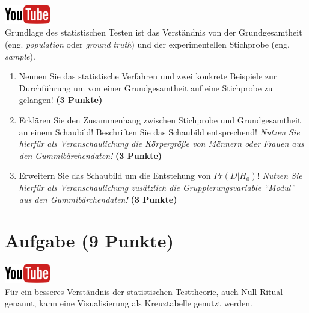 \documentclass[a4paper, 9pt]{scrartcl}\usepackage[]{graphicx}\usepackage[]{xcolor}
\begin{document}
\hfill\href{https://youtu.be/aHVYuFKTqZs}{\includegraphics[width =
  2cm]{img/youtube}}\\[1Ex]

Grundlage des statistischen Testen ist das Verst{\"a}ndnis von der
Grundgesamtheit (eng. \textit{population} oder \textit{ground truth}) und
der experimentellen Stichprobe (eng. \textit{sample}). 

\begin{enumerate}
\item Nennen Sie das statistische Verfahren und zwei konkrete Beispiele zur
  Durchf{\"u}hrung um von einer Grundgesamtheit auf eine Stichprobe zu
  gelangen! \textbf{(3 Punkte)}
\item Erkl{\"a}ren Sie den Zusammenhang zwischen Stichprobe und Grundgesamtheit
  an einem Schaubild! Beschriften Sie das Schaubild entsprechend!
  \textit{Nutzen Sie hierf{\"u}r als Veranschaulichung die K{\"o}rpergr{\"o}{\ss}e von
    M{\"a}nnern oder Frauen aus den Gummib{\"a}rchendaten!}  \textbf{(3 Punkte)}
\item Erweitern Sie das Schaubild um die Entstehung von $Pr(D|H_0)$!
  \textit{Nutzen Sie hierf{\"u}r als Veranschaulichung zus{\"a}tzlich die
    Gruppierungsvariable "`Modul"' aus den Gummib{\"a}rchendaten!}  \textbf{(3
    Punkte)}
\end{enumerate} 
\clearpage

\section{Aufgabe \hfill (9 Punkte)}

\hfill\href{https://youtu.be/Ric8ne39DtI}{\includegraphics[width =
  2cm]{img/youtube}}\\[1Ex]




F{\"u}r ein besseres Verst{\"a}ndnis der statistischen Testtheorie, auch
Null-Ritual genannt, kann eine Visualisierung als Kreuztabelle genutzt werden.  
\end{document}
